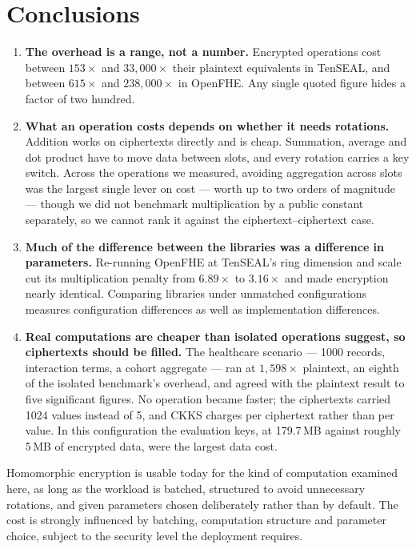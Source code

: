 \documentclass[11pt,a4paper]{article}
\begin{document}
\section{Conclusions}

\begin{enumerate}[label=\textbf{\arabic*.}]
\item \textbf{The overhead is a range, not a number.} Encrypted operations cost
between $153\times$ and $33{,}000\times$ their plaintext equivalents in TenSEAL, and
between $615\times$ and $238{,}000\times$ in OpenFHE. Any single quoted figure hides a
factor of two hundred.

\item \textbf{What an operation costs depends on whether it needs rotations.}
Addition works on ciphertexts directly and is cheap. Summation, average and dot
product have to move data between slots, and every rotation carries a key switch.
Across the operations we measured, avoiding aggregation across slots was the largest
single lever on cost --- worth up to two orders of magnitude --- though we did not
benchmark multiplication by a public constant separately, so we cannot rank it
against the ciphertext--ciphertext case.

\item \textbf{Much of the difference between the libraries was a difference in
parameters.} Re-running OpenFHE at TenSEAL's ring dimension and scale cut its
multiplication penalty from $6.89\times$ to $3.16\times$ and made encryption nearly
identical. Comparing libraries under unmatched configurations measures configuration
differences as well as implementation differences.

\item \textbf{Real computations are cheaper than isolated operations suggest, so
ciphertexts should be filled.} The healthcare scenario --- 1000 records, interaction
terms, a cohort aggregate --- ran at $1{,}598\times$ plaintext, an eighth of the
isolated benchmark's overhead, and agreed with the plaintext result to five
significant figures. No operation became faster; the ciphertexts carried 1024 values
instead of 5, and CKKS charges per ciphertext rather than per value. In this
configuration the evaluation keys, at 179.7\,MB against roughly 5\,MB of encrypted
data, were the largest data cost.
\end{enumerate}

Homomorphic encryption is usable today for the kind of computation examined here, as
long as the workload is batched, structured to avoid unnecessary rotations, and given
parameters chosen deliberately rather than by default. The cost is strongly
influenced by batching, computation structure and parameter choice, subject to the
security level the deployment requires.
\end{document}
